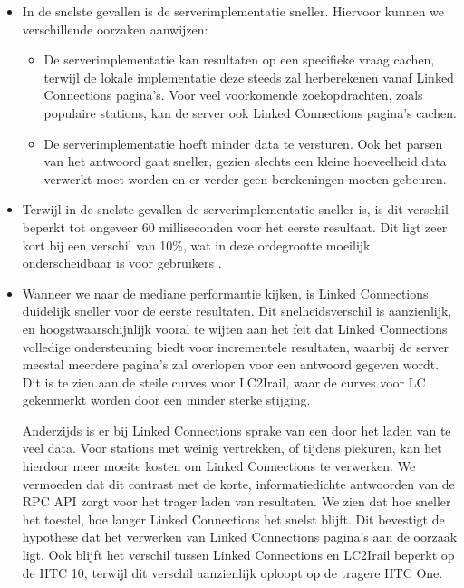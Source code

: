 \begin{itemize}
    \item In de snelste gevallen is de serverimplementatie sneller. Hiervoor kunnen we verschillende oorzaken aanwijzen: 
	\begin{itemize}
		\item De serverimplementatie kan resultaten op een specifieke vraag cachen, terwijl de lokale implementatie deze steeds zal herberekenen vanaf Linked Connections pagina's. Voor veel voorkomende zoekopdrachten, zoals populaire stations, kan de server ook Linked Connections pagina's cachen.
		\item De serverimplementatie hoeft minder data te versturen. Ook het parsen van het antwoord gaat sneller, gezien slechts een kleine hoeveelheid data verwerkt moet worden en er verder geen berekeningen moeten gebeuren.
	\end{itemize}

	\item Terwijl in de snelste gevallen de serverimplementatie sneller is, is dit verschil beperkt tot ongeveer 60 milliseconden voor het eerste resultaat. Dit ligt zeer kort bij een verschil van 10\%, wat in deze ordegrootte moeilijk onderscheidbaar is voor gebruikers \citep{miller68}. %
	
	\item Wanneer we naar de mediane performantie kijken, is Linked Connections duidelijk sneller voor de eerste resultaten. Dit snelheidsverschil is aanzienlijk, en hoogstwaarschijnlijk vooral te wijten aan het feit dat Linked Connections volledige ondersteuning biedt voor incrementele resultaten, waarbij de server meestal meerdere pagina's zal overlopen voor een  antwoord gegeven wordt. Dit is te zien aan de steile curves voor LC2Irail, waar de curves voor LC gekenmerkt worden door een minder sterke stijging. 
	
	Anderzijds is er bij Linked Connections sprake van een  door het laden van te veel data. Voor stations met weinig vertrekken, of tijdens piekuren, kan het hierdoor meer moeite kosten om Linked Connections te verwerken. We vermoeden dat dit contrast met de korte, informatiedichte antwoorden van de RPC API zorgt voor het trager laden van resultaten. We zien dat hoe sneller het toestel, hoe langer Linked Connections het snelst blijft. Dit bevestigt de hypothese dat het verwerken van Linked Connections pagina's aan de oorzaak ligt. Ook blijft het verschil tussen Linked Connections en LC2Irail beperkt op de HTC 10, terwijl dit verschil aanzienlijk oploopt op de tragere HTC One.
	

\end{itemize}
